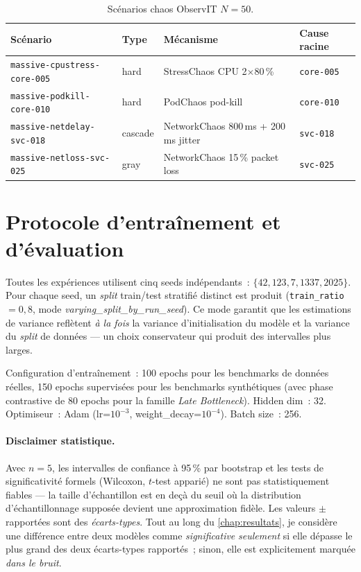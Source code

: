 \documentclass[a4paper,11pt,oneside]{report}
\begin{document}
\begin{table}[ht]
\centering
\caption{Sc\'enarios chaos ObservIT $N{=}50$.}
\label{tab:n50-scenarios}
\begin{tabular}{llll}
\toprule
Sc\'enario & Type & M\'ecanisme & Cause racine \\
\midrule
\texttt{massive-cpustress-core-005} & hard & StressChaos CPU 2$\times$80\,\% & \texttt{core-005} \\
\texttt{massive-podkill-core-010} & hard & PodChaos pod-kill & \texttt{core-010} \\
\texttt{massive-netdelay-svc-018} & cascade & NetworkChaos 800\,ms + 200\,ms jitter & \texttt{svc-018} \\
\texttt{massive-netloss-svc-025} & gray & NetworkChaos 15\,\% packet loss & \texttt{svc-025} \\
\bottomrule
\end{tabular}
\end{table}

\section{Protocole d'entra\^inement et d'\'evaluation}
\label{sec:protocole}

Toutes les exp\'eriences utilisent cinq seeds ind\'ependants~: $\{42, 123, 7, 1337, 2025\}$. Pour chaque seed, un \emph{split} train/test stratifi\'e distinct est produit (\texttt{train\_ratio}~$=0{,}8$, mode \emph{varying\_split\_by\_run\_seed}). Ce mode garantit que les estimations de variance refl\`etent \emph{\`a la fois} la variance d'initialisation du mod\`ele et la variance du \emph{split} de donn\'ees --- un choix conservateur qui produit des intervalles plus larges.

Configuration d'entra\^inement~: 100 epochs pour les benchmarks de donn\'ees r\'eelles, 150 epochs supervis\'ees pour les benchmarks synth\'etiques (avec phase contrastive de 80 epochs pour la famille \emph{Late Bottleneck}). Hidden dim~: 32. Optimiseur~: Adam (lr=$10^{-3}$, weight\_decay=$10^{-4}$). Batch size~: 256.

\paragraph{Disclaimer statistique.} Avec $n{=}5$, les intervalles de confiance \`a 95\,\% par bootstrap et les tests de significativit\'e formels (Wilcoxon, $t$-test appari\'e) ne sont pas statistiquement fiables --- la taille d'\'echantillon est en de\c{c}\`a du seuil o\`u la distribution d'\'echantillonnage suppos\'ee devient une approximation fid\`ele. Les valeurs $\pm$ rapport\'ees sont des \emph{\'ecarts-types}. Tout au long du \cref{chap:resultats}, je consid\`ere une diff\'erence entre deux mod\`eles comme \emph{significative} \emph{seulement} si elle d\'epasse le plus grand des deux \'ecarts-types rapport\'es~; sinon, elle est explicitement marqu\'ee \emph{dans le bruit}.
\end{document}

